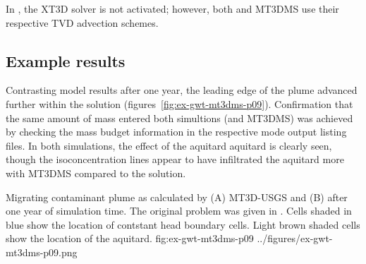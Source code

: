 

In \mf, the XT3D solver is not activated; however, both \mf and MT3DMS use their respective TVD advection schemes.  

\subsection{Example results}

Contrasting model results after one year, the leading edge of the plume advanced further within the \mf solution (figures~\ref{fig:ex-gwt-mt3dms-p09}). Confirmation that the same amount of mass entered both simultions (\mf and MT3DMS) was achieved by checking the mass budget information in the respective mode output listing files. In both simulations, the effect of the aquitard aquitard is clearly seen, though the isoconcentration lines appear to have infiltrated the aquitard more with MT3DMS compared to the \mf solution.  

\begin{StandardFigure}
	{Migrating contaminant plume as calculated by (A) MT3D-USGS and (B) \mf after one year of simulation time.  The original problem was given in \citep{zheng1999mt3dms}.  Cells shaded in blue show the location of contstant head boundary cells.  Light brown shaded cells show the location of the aquitard.} 
	{fig:ex-gwt-mt3dms-p09}
	{../figures/ex-gwt-mt3dms-p09.png}
\end{StandardFigure}
